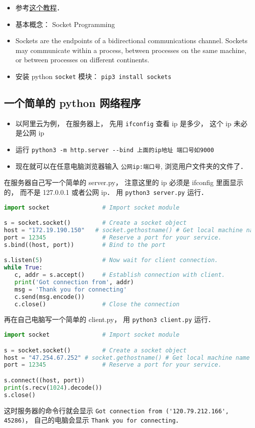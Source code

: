 
\begin{itemize}
\item 参考\href{https://www.tutorialspoint.com/python/python_networking.htm}{这个教程}．
\item 基本概念： Socket Programming
\item Sockets are the endpoints of a bidirectional communications channel. Sockets may communicate within a process, between processes on the same machine, or between processes on different continents.
\item 安装 python \verb|socket| 模块： \verb|pip3 install sockets|
\end{itemize}

\subsection{一个简单的 python 网络程序}
\begin{itemize}
\item 以阿里云为例， 在服务器上， 先用 \verb|ifconfig| 查看 ip 是多少， 这个 ip 未必是公网 ip
\item 运行 \verb|python3 -m http.server --bind 上面的ip地址 端口号如9000|
\item 现在就可以在任意电脑浏览器输入 \verb|公网ip:端口号|, 浏览用户文件夹的文件了．
\end{itemize}

在服务器自己写一个简单的 server.py， 注意这里的 ip 必须是 ifconfig 里面显示的， 而不是 127.0.0.1 或者公网 ip． 用 \verb|python3 server.py| 运行．
\begin{lstlisting}[language=python]
import socket               # Import socket module

s = socket.socket()         # Create a socket object
host = "172.19.190.150"   # socket.gethostname() # Get local machine name
port = 12345                # Reserve a port for your service.
s.bind((host, port))        # Bind to the port

s.listen(5)                 # Now wait for client connection.
while True:
   c, addr = s.accept()     # Establish connection with client.
   print('Got connection from', addr)
   msg = 'Thank you for connecting'
   c.send(msg.encode())
   c.close()                # Close the connection
\end{lstlisting}

再在自己电脑写一个简单的 client.py， 用 \verb|python3 client.py| 运行．
\begin{lstlisting}[language=python]
import socket               # Import socket module

s = socket.socket()         # Create a socket object
host = "47.254.67.252" # socket.gethostname() # Get local machine name
port = 12345                # Reserve a port for your service.

s.connect((host, port))
print(s.recv(1024).decode())
s.close()
\end{lstlisting}

这时服务器的命令行就会显示 \verb|Got connection from ('120.79.212.166', 45286)|， 自己的电脑会显示 \verb|Thank you for connecting|．
